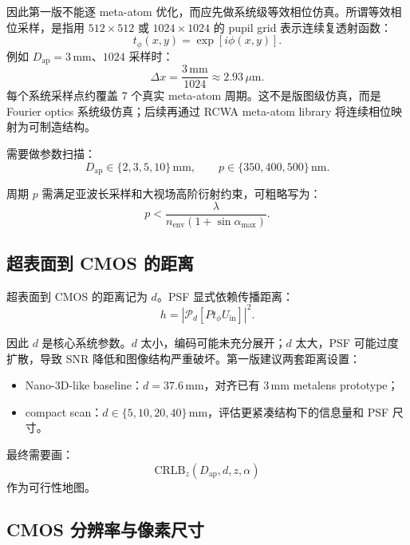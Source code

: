 \documentclass[11pt,a4paper,fontset=none]{ctexart}
\begin{document}
因此第一版不能逐 meta-atom 优化，而应先做系统级等效相位仿真。所谓等效相位采样，是指用 $512\times512$ 或 $1024\times1024$ 的 pupil grid 表示连续复透射函数：
\begin{equation}
  t_\phi(x,y)=\exp[i\phi(x,y)].
\end{equation}
例如 $D_{\mathrm{ap}}=3\,\mathrm{mm}$、$1024$ 采样时：
\begin{equation}
  \Delta x=
  \frac{3\,\mathrm{mm}}{1024}
  \approx
  2.93\,\mu\mathrm{m}.
\end{equation}
每个系统采样点约覆盖 $7$ 个真实 meta-atom 周期。这不是版图级仿真，而是 Fourier optics 系统级仿真；后续再通过 RCWA meta-atom library 将连续相位映射为可制造结构。

需要做参数扫描：
\begin{equation}
  D_{\mathrm{ap}}\in\{2,3,5,10\}\,\mathrm{mm},
  \qquad
  p\in\{350,400,500\}\,\mathrm{nm}.
\end{equation}

周期 $p$ 需满足亚波长采样和大视场高阶衍射约束，可粗略写为：
\begin{equation}
  p<
  \frac{\lambda}{n_{\mathrm{env}}(1+\sin\alpha_{\max})}.
\end{equation}

\subsection{超表面到 CMOS 的距离}

超表面到 CMOS 的距离记为 $d$。PSF 显式依赖传播距离：
\begin{equation}
  h=
  \left|
  \mathcal P_d
  \left[
  P t_\phi U_{\mathrm{in}}
  \right]
  \right|^2.
\end{equation}

因此 $d$ 是核心系统参数。$d$ 太小，编码可能未充分展开；$d$ 太大，PSF 可能过度扩散，导致 SNR 降低和图像结构严重破坏。第一版建议两套距离设置：
\begin{itemize}
  \item Nano-3D-like baseline：$d=37.6\,\mathrm{mm}$，对齐已有 $3\,\mathrm{mm}$ metalens prototype；
  \item compact scan：$d\in\{5,10,20,40\}\,\mathrm{mm}$，评估更紧凑结构下的信息量和 PSF 尺寸。
\end{itemize}
最终需要画：
\begin{equation}
  \mathrm{CRLB}_z(D_{\mathrm{ap}},d,z,\alpha)
\end{equation}
作为可行性地图。

\subsection{CMOS 分辨率与像素尺寸}
\end{document}
